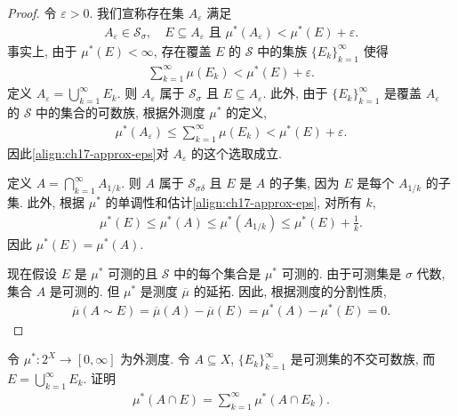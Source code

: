 \documentclass[../../main.tex]{subfiles}
\begin{document}
\begin{proof}
令 $\varepsilon>0$. 我们宣称存在集 $A_{\varepsilon}$ 满足
\begin{align}
A_{\varepsilon}\in\mathcal{S}_{\sigma},\quad E\subseteq A_{\varepsilon}\text{ 且 }\mu^*(A_{\varepsilon})<\mu^*(E)+\varepsilon.\label{align:ch17-approx-eps}
\end{align}
事实上, 由于 $\mu^*(E)<\infty$, 存在覆盖 $E$ 的 $\mathcal{S}$ 中的集族 $\{E_{k}\}_{k=1}^{\infty}$ 使得
\begin{align*}
\sum_{k=1}^{\infty}\mu(E_{k})<\mu^*(E)+\varepsilon.
\end{align*}
定义 $A_{\varepsilon}=\bigcup_{k=1}^{\infty}E_{k}$. 则 $A_{\varepsilon}$ 属于 $\mathcal{S}_{\sigma}$ 且 $E\subseteq A_{\varepsilon}$. 此外, 由于 $\{E_{k}\}_{k=1}^{\infty}$ 是覆盖 $A_{\varepsilon}$ 的 $\mathcal{S}$ 中的集合的可数族, 根据外测度 $\mu^*$ 的定义,
\begin{align*}
\mu^*(A_{\varepsilon})\leqslant\sum_{k=1}^{\infty}\mu(E_{k})<\mu^*(E)+\varepsilon.
\end{align*}
因此\eqref{align:ch17-approx-eps}对 $A_{\varepsilon}$ 的这个选取成立.

定义 $A=\bigcap_{k=1}^{\infty}A_{1/k}$. 则 $A$ 属于 $\mathcal{S}_{\sigma\delta}$ 且 $E$ 是 $A$ 的子集, 因为 $E$ 是每个 $A_{1/k}$ 的子集. 此外, 根据 $\mu^*$ 的单调性和估计\eqref{align:ch17-approx-eps}, 对所有 $k$,
\begin{align*}
\mu^*(E)\leqslant\mu^*(A)\leqslant\mu^*(A_{1/k})\leqslant\mu^*(E)+\frac{1}{k}.
\end{align*}
因此 $\mu^*(E)=\mu^*(A)$.

现在假设 $E$ 是 $\mu^*$ 可测的且 $\mathcal{S}$ 中的每个集合是 $\mu^*$ 可测的. 由于可测集是 $\sigma$ 代数, 集合 $A$ 是可测的. 但 $\mu^*$ 是测度 $\overline{\mu}$ 的延拓. 因此, 根据测度的分割性质,
\begin{align*}
\overline{\mu}(A\sim E)=\overline{\mu}(A)-\overline{\mu}(E)=\mu^*(A)-\mu^*(E)=0.
\end{align*}
\end{proof}

\begin{exercise}\label{exercise:ch17-18}
令 $\mu^*:2^{X}\to[0,\infty]$ 为外测度. 令 $A\subseteq X$, $\{E_{k}\}_{k=1}^{\infty}$ 是可测集的不交可数族, 而 $E=\bigcup_{k=1}^{\infty}E_{k}$. 证明
\begin{align*}
\mu^*(A\cap E)=\sum_{k=1}^{\infty}\mu^*(A\cap E_{k}).
\end{align*}
\end{exercise}
\end{document}
